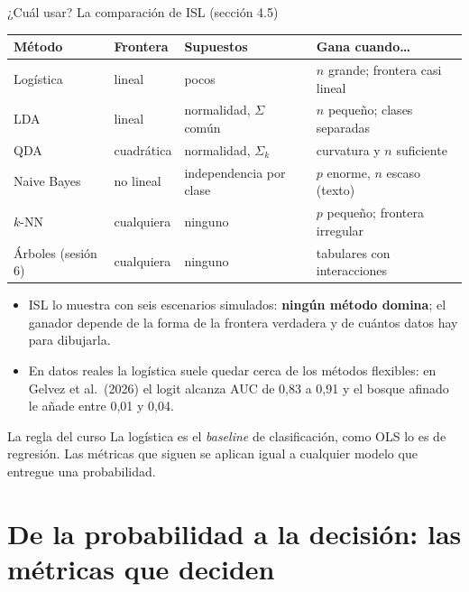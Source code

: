 \documentclass{beamer}
\newcommand{\1}{\mathbb{I}}
\begin{document}
\begin{frame}{¿Cuál usar? La comparación de ISL (sección 4.5)}
\small
\begin{center}
\scriptsize
\setlength{\tabcolsep}{4pt}
\renewcommand{\arraystretch}{1.2}
\begin{tabular}{llll}
\hline
Método & Frontera & Supuestos & Gana cuando\ldots \\
\hline
Logística & lineal & pocos & $n$ grande; frontera casi lineal \\
LDA & lineal & normalidad, $\Sigma$ común & $n$ pequeño; clases separadas \\
QDA & cuadrática & normalidad, $\Sigma_k$ & curvatura y $n$ suficiente \\
Naive Bayes & no lineal & independencia por clase & $p$ enorme, $n$ escaso (texto) \\
$k$-NN & cualquiera & ninguno & $p$ pequeño; frontera irregular \\
Árboles (sesión 6) & cualquiera & ninguno & tabulares con interacciones \\
\hline
\end{tabular}
\end{center}
\pause
\begin{itemize}\itemsep2pt
  \item ISL lo muestra con seis escenarios simulados: \textbf{ningún método domina}; el ganador depende de la forma de la frontera verdadera y de cuántos datos hay para dibujarla. \pause
  \item En datos reales la logística suele quedar cerca de los métodos flexibles: en Gelvez et al.\ (2026) el logit alcanza AUC de 0,83 a 0,91 y el bosque afinado le añade entre 0,01 y 0,04. \pause
\end{itemize}
\begin{block}{La regla del curso}
La logística es el \emph{baseline} de clasificación, como OLS lo es de regresión. Las métricas que siguen se aplican igual a cualquier modelo que entregue una probabilidad.
\end{block}
\end{frame}


\section{De la probabilidad a la decisión: las métricas que deciden}
\begin{frame}[noframenumbering]
\tableofcontents[currentsection]
\end{frame}
\end{document}
